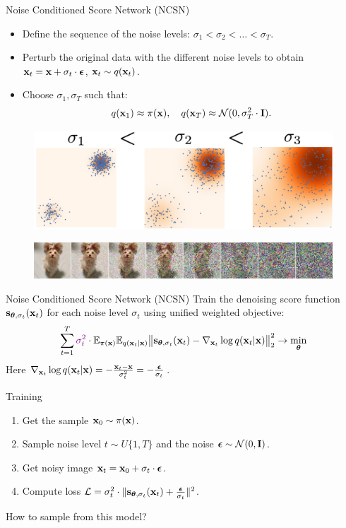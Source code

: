 \begin{frame}{Noise Conditioned Score Network (NCSN)}
	\begin{itemize}
		\item Define the sequence of the noise levels: $\sigma_1 < \sigma_2 < \dots < \sigma_T$.
		\item Perturb the original data with the different noise levels to obtain $\mathbf{x}_t = \mathbf{x} + \sigma_t \cdot \boldsymbol{\epsilon}$, $\mathbf{x}_t \sim q(\mathbf{x}_t)$. 
		\item Choose $\sigma_1, \sigma_T$ such that:
		\[
			q(\mathbf{x}_1) \approx \pi(\mathbf{x}), \quad q(\mathbf{x}_T) \approx \mathcal{N}(0, \sigma_T^2 \cdot \mathbf{I}).
		\]
	\end{itemize}
	\begin{figure}
		\includegraphics[width=0.6\linewidth]{figs/multi_scale}
	\end{figure}
	\begin{figure}
		\includegraphics[width=\linewidth]{figs/duoduo}
	\end{figure}
\end{frame}
\begin{frame}{Noise Conditioned Score Network (NCSN)}
	Train the denoising score function $\mathbf{s}_{\boldsymbol{\theta}, \sigma_t}(\mathbf{x}_t)$ for each noise level $\sigma_t$ using unified weighted objective:
	\vspace{-0.2cm}
	\[
		\sum_{t=1}^T {\color{violet}\sigma_t^2} \cdot \mathbb{E}_{\pi(\mathbf{x})} \mathbb{E}_{q(\mathbf{x}_t | \mathbf{x})}\bigl\| \mathbf{s}_{\boldsymbol{\theta}, \sigma_t}(\mathbf{x}_t) - \nabla_{\mathbf{x}_t} \log q(\mathbf{x}_t | \mathbf{x}) \bigr\|^2_2 \rightarrow \min_{\boldsymbol{\theta}}
	\]
	Here $\nabla_{\mathbf{x}_t} \log q(\mathbf{x}_t | \mathbf{x}) = - \frac{\mathbf{x}_t - \mathbf{x}}{\sigma_t^2} = - \frac{\boldsymbol{\epsilon}}{\sigma_t}$.
	\begin{block}{Training}
		\begin{enumerate}
			\item Get the sample $\mathbf{x}_0 \sim \pi(\mathbf{x})$.
			\item Sample noise level $t \sim U\{1, T\}$ and the noise $\boldsymbol{\epsilon} \sim \mathcal{N}(0, \mathbf{I})$.
			\item Get noisy image $\mathbf{x}_t = \mathbf{x}_0 + \sigma_t \cdot \boldsymbol{\epsilon}$.
			\item Compute loss $ \mathcal{L} = \sigma_t^2 \cdot \| \mathbf{s}_{\boldsymbol{\theta}, \sigma_t}(\mathbf{x}_t) + \frac{\boldsymbol{\epsilon}}{\sigma_t} \|^2 $.
		\end{enumerate}
	\end{block}
	How to sample from this model?
\end{frame}

